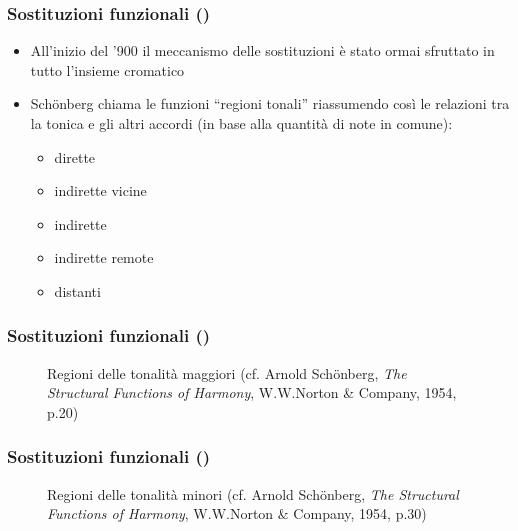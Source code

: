 \begin{frame}
  \frametitle{Sostituzioni funzionali ()}
        
    \begin{itemize}

        \item All'inizio del '900 il meccanismo delle sostituzioni \`e stato ormai
            sfruttato in tutto l'insieme cromatico

        \item Sch\"onberg chiama le funzioni ``regioni tonali'' riassumendo cos\`i le
            relazioni tra la tonica e gli altri accordi (in base alla quantit\`a di note in comune):

        \begin{itemize}

            \item dirette
            \item indirette vicine
            \item indirette
            \item indirette remote
            \item distanti

        \end{itemize}

    \end{itemize}

\end{frame}

\begin{frame}
  \frametitle{Sostituzioni funzionali ()}
        
	\begin{center} 
	    \begin{figure}
	        \caption{Regioni delle tonalit\`a maggiori
	            (cf. Arnold Sch\"onberg, \emph{The Structural Functions of Harmony},
	            W.W.Norton \& Company, 1954, p.20)}
	    \end{figure}
	\end{center} 

\end{frame}

\begin{frame}
  \frametitle{Sostituzioni funzionali ()}
        
	\begin{center} 
	    \begin{figure}
	        \caption{Regioni delle tonalit\`a minori
	            (cf. Arnold Sch\"onberg, \emph{The Structural Functions of Harmony},
	            W.W.Norton \& Company, 1954, p.30)}
	    \end{figure}
	\end{center} 

\end{frame}


